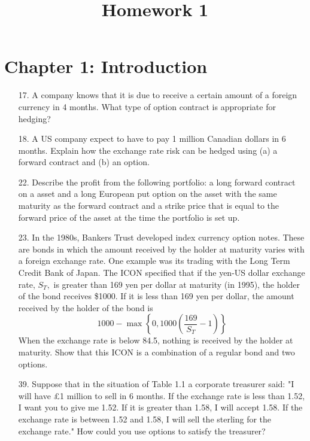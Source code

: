 \documentclass{article}
\begin{document}
\title{Homework 1}
\maketitle
\thispagestyle{fancy}

\section*{Chapter 1: Introduction}

\begin{itemize}
	\item[17.] A company knows that it is due to receive a certain amount of a foreign currency in 4 months. What type of option contract is appropriate for hedging?

	\item[18.] A US company expect to have to pay 1 million Canadian dollars in 6 months. Explain how the exchange rate risk can be hedged using (a) a forward contract and (b) an option.

	\item[22.] Describe the profit from the following portfolio: a long forward contract on a asset and a long European put option on the asset with the same maturity as the forward contract and a strike price that is equal to the forward price of the asset at the time the portfolio is set up.

	\item[23.] In the 1980s, Bankers Trust developed index currency option notes. These are bonds in which the amount received by the holder at maturity varies with a foreign exchange rate. One example was its trading with the Long Term Credit Bank of Japan. The ICON specified that if the yen-US dollar exchange rate, $S_T,$ is greater than 169 yen per dollar at maturity (in 1995), the holder of the bond receives \$1000. If it is less than 169 yen per dollar, the amount received by the holder of the bond is
		\[1000-\max\left\{ 0, 1000\left( \frac{169}{S_T}-1 \right) \right\}\]
		When the exchange rate is below 84.5, nothing is received by the holder at maturity. Show that this ICON is a combination of a regular bond and two options.

	\item[39.] Suppose that in the situation of Table 1.1 a corporate treasurer said: "I will have \pounds1 million to sell in 6 months. If the exchange rate is less than 1.52, I want you to give me 1.52. If it is greater than 1.58, I will accept 1.58. If the exchange rate is between 1.52 and 1.58, I will sell the sterling for the exchange rate." How could you use options to satisfy the treasurer?


\end{itemize}
\end{document}
